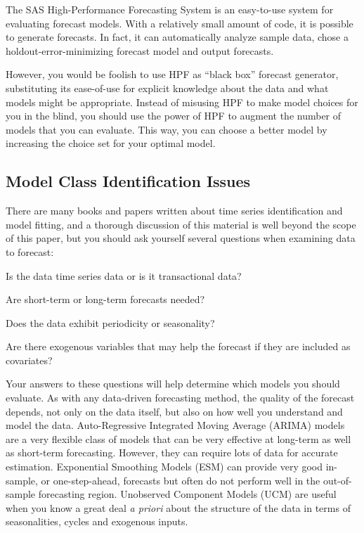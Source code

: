 \documentclass[10pt]{sugconf-ish}
\begin{document}
The SAS High-Performance Forecasting System is an easy-to-use system for evaluating forecast models. With a relatively small amount of code, it is possible to generate forecasts. In fact, it can automatically analyze sample data, chose a holdout-error-minimizing forecast model and output forecasts.

However, you would be foolish to use HPF as ``black box'' forecast generator, substituting its ease-of-use for explicit knowledge about the data and what models might be appropriate. Instead of misusing HPF to make model choices for you in the blind, you should use the power of HPF to augment the number of models that you can evaluate. This way, you can choose a better model by increasing the choice set for your optimal model.


\subsection{Model Class Identification Issues}
There are many books and papers written about time series identification and model fitting, and a thorough discussion of this material is well beyond the scope of this paper, but you should ask yourself several questions when examining data to forecast:
\begin{list}{\textbullet}{\setlength{\itemsep}{0pt}\setlength{\topsep}{0pt}
  \setlength{\parsep}{0pt}}
\item Is the data time series data or is it transactional data?
\item Are short-term or long-term forecasts needed?
\item Does the data exhibit periodicity or seasonality?
\item Are there exogenous variables that may help the forecast if they are included as covariates?   
\end{list}
Your answers to these questions will help determine which models you should evaluate. As with any data-driven forecasting method, the quality of the forecast depends, not only on the data itself, but also on how well you understand and model the data.
Auto-Regressive Integrated Moving Average (ARIMA) models are a very flexible class of models that can be very effective at long-term as well as short-term forecasting. However, they can require lots of data for accurate estimation.
Exponential Smoothing Models (ESM) can provide very good in-sample, or one-step-ahead, forecasts but often do not perform well in the out-of-sample forecasting region.
Unobserved Component Models (UCM) are useful when you know a great deal \emph{a priori} about the structure of the data in terms of seasonalities, cycles and exogenous inputs.
\end{document}
